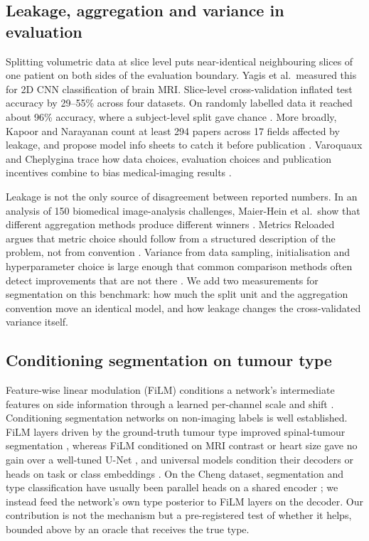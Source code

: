 \documentclass[11pt,a4paper]{article}
\begin{document}
\subsection{Leakage, aggregation and variance in evaluation}

Splitting volumetric data at slice level puts near-identical neighbouring slices
of one patient on both sides of the evaluation boundary. Yagis et al.\ measured
this for 2D CNN classification of brain MRI. Slice-level cross-validation inflated
test accuracy by 29--55\% across four datasets. On randomly labelled data it
reached about 96\% accuracy, where a subject-level split gave chance
\citep{yagis2021}. More broadly, Kapoor and Narayanan count at least 294 papers
across 17 fields affected by leakage, and propose model info sheets to catch it
before publication \citep{kapoor2023}. Varoquaux and Cheplygina trace how data
choices, evaluation choices and publication incentives combine to bias
medical-imaging results \citep{varoquaux2022}.

Leakage is not the only source of disagreement between reported numbers. In an
analysis of 150 biomedical image-analysis challenges, Maier-Hein et al.\ show that
different aggregation methods produce different winners
\citep{maierhein2018}. Metrics Reloaded argues that metric
choice should follow from a structured description of the problem, not from
convention \citep{maierhein2024}. Variance from data sampling, initialisation and
hyperparameter choice is large enough that common comparison methods often detect
improvements that are not there \citep{bouthillier2021}. We add two measurements for segmentation on
this benchmark: how much the split unit and the aggregation convention move an
identical model, and how leakage changes the cross-validated variance itself.

\subsection{Conditioning segmentation on tumour type}

Feature-wise linear modulation (FiLM) conditions a network's intermediate features
on side information through a learned per-channel scale and shift
\citep{perez2018}. Conditioning segmentation networks on non-imaging labels is well established. FiLM layers driven by the ground-truth tumour type improved spinal-tumour segmentation  \citep{lemay2021}, whereas FiLM conditioned on MRI contrast or heart size gave no gain over a well-tuned U-Net  \citep{vincent2020,jacenkow2019}, and universal models condition their decoders or heads on task or class embeddings  \citep{zhang2021dodnet,liu2023clip,ye2023uniseg}. On the Cheng dataset, segmentation and type classification have usually been parallel heads on a shared encoder  \citep{rai2024}; we instead feed the network's own type posterior to FiLM layers on the decoder. Our contribution is not the mechanism but a pre-registered test of whether it helps, bounded above by an oracle that receives the true type.
\end{document}
